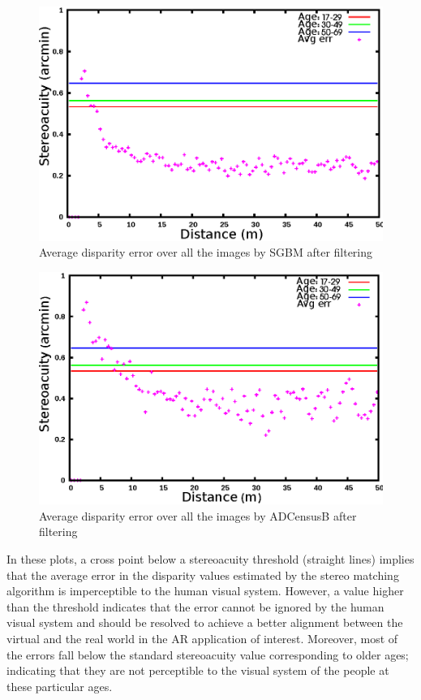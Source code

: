 \begin{figure}[H]
\centering
\includegraphics[scale=0.95]{sgbmmsk3}
\caption{Average disparity error over all the images by SGBM after filtering}
\label{fig:mskmapsgbm3}
\end{figure} 
\begin{figure}[H]
\centering
\includegraphics[scale=0.95]{adcenmsk3}
\caption{Average disparity error over all the images by ADCensusB after filtering}
\label{fig:mskmapadc3}
\end{figure} 

In these plots, a cross point below a stereoacuity threshold (straight lines) implies that the average error in the disparity values estimated 
by the stereo matching 
algorithm is imperceptible to the human visual system. However, a value higher than the threshold indicates that
the error cannot be ignored by the human visual system and should be resolved to achieve a better alignment between the virtual and the 
real world in the AR application of interest. Moreover, most of the errors
fall below the standard stereoacuity value corresponding to older ages; indicating that they are not perceptible to the visual system of the people at these 
particular ages.

